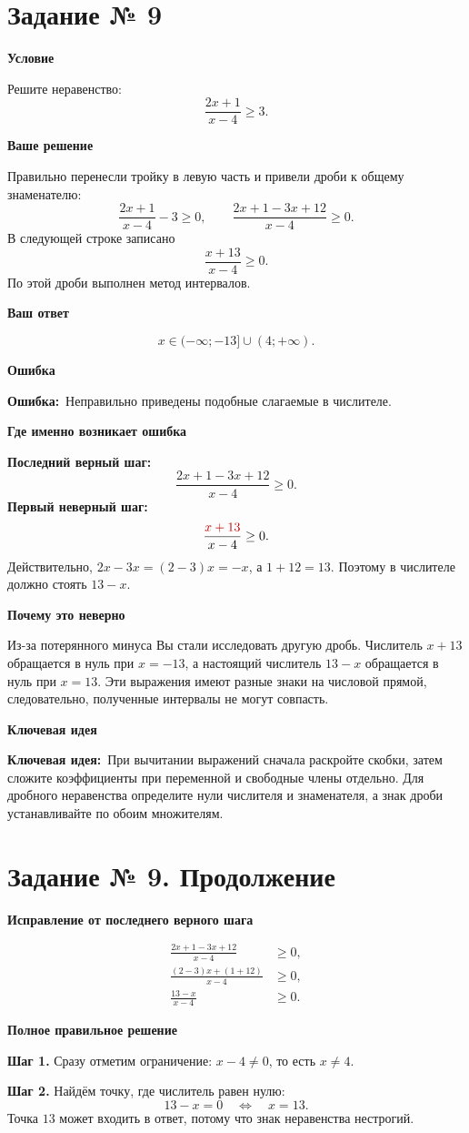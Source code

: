 \documentclass[a4paper,12pt]{article}
\newcommand{\smalllabel}[1]{\par\smallskip\textbf{#1}\par\nobreak}
\newcommand{\errlabel}{\textcolor{red!75!black}{\textbf{Ошибка:}}}
\newcommand{\ideallabel}{\textcolor{blue!60!black}{\textbf{Ключевая идея:}}}
\begin{document}
\section*{Задание № 9}
\smalllabel{Условие}
Решите неравенство:
\[
\frac{2x+1}{x-4}\ge 3.
\]
\smalllabel{Ваше решение}
Правильно перенесли тройку в левую часть и привели дроби к общему знаменателю:
\[
\frac{2x+1}{x-4}-3\ge0,
\qquad
\frac{2x+1-3x+12}{x-4}\ge0.
\]
В следующей строке записано
\[
\frac{x+13}{x-4}\ge0.
\]
По этой дроби выполнен метод интервалов.

\smalllabel{Ваш ответ}
\[
 x\in(-\infty;-13]\cup(4;+\infty).
\]
\smalllabel{Ошибка}
\errlabel\ Неправильно приведены подобные слагаемые в числителе.

\smalllabel{Где именно возникает ошибка}
\textbf{Последний верный шаг:}
\[
\frac{2x+1-3x+12}{x-4}\ge0.
\]
\textbf{Первый неверный шаг:}
\[
\frac{\color{red!75!black}{x}+13}{x-4}\ge0.
\]
Действительно, $2x-3x=(2-3)x=-x$, а $1+12=13$.
Поэтому в числителе должно стоять $13-x$.

\smalllabel{Почему это неверно}
Из-за потерянного минуса Вы стали исследовать другую дробь.
Числитель $x+13$ обращается в нуль при $x=-13$,
а настоящий числитель $13-x$ обращается в нуль при $x=13$.
Эти выражения имеют разные знаки на числовой прямой,
следовательно, полученные интервалы не могут совпасть.

\smalllabel{Ключевая идея}
\ideallabel\ При вычитании выражений сначала раскройте скобки,
затем сложите коэффициенты при переменной и свободные члены отдельно.
Для дробного неравенства определите нули числителя и знаменателя,
а знак дроби устанавливайте по обоим множителям.
\clearpage
\section*{Задание № 9. Продолжение}
\smalllabel{Исправление от последнего верного шага}
\[
\begin{aligned}
\frac{2x+1-3x+12}{x-4}&\ge0,\\[3pt]
\frac{(2-3)x+(1+12)}{x-4}&\ge0,\\[3pt]
\frac{13-x}{x-4}&\ge0.
\end{aligned}
\]
\smalllabel{Полное правильное решение}
\textbf{Шаг 1.} Сразу отметим ограничение: $x-4\ne0$, то есть $x\ne4$.

\textbf{Шаг 2.} Найдём точку, где числитель равен нулю:
\[
13-x=0\quad\Longleftrightarrow\quad x=13.
\]
Точка $13$ может входить в ответ, потому что знак неравенства нестрогий.
\end{document}
